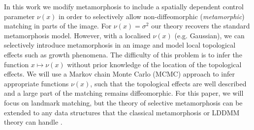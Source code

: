 \documentclass[runningheads]{llncs}
\begin{document}
In this work we modify metamorphosis to include a spatially dependent control
parameter $\nu(x)$ in order to selectively allow non-diffeomorphic
(\emph{metamorphic}) matching in parts of the image. For $\nu(x) = \sigma^2$ our
theory recovers the standard metamorphosis model. However, with a localised
$\nu(x)$ (e.g. Gaussian), we can selectively introduce metamorphosis in an image
and model local topological effects such as growth phenomena. The difficulty of
this problem is to infer the function $x\mapsto\nu(x)$ without prior knowledge
of the location of the topological effects. We will use a Markov chain Monte
Carlo (MCMC) approach to infer appropriate functions $\nu(x)$, such that the
topological effects are well described and a large part of the matching remains
diffeomorphic. For this paper, we will focus on landmark matching, but the
theory of selective metamorphosis can be extended to any data structures that
the classical metamorphosis or LDDMM theory can handle
\cite{bockarnaudoncotter2019}.
\end{document}
